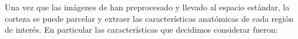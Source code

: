 \documentclass[11pt,letterpaper]{article}
\numberwithin{equation}{subsection}
\numberwithin{table}{subsection}
\begin{document}
\bigskip
\noindent Una vez que las imágenes de han preprocesado y llevado al espacio estándar, la corteza se puede parcelar y extraer las características anatómicas de cada región de interés. En particular las características que decidimos considerar fueron:
%
%
%
%
%
%
\end{document}
